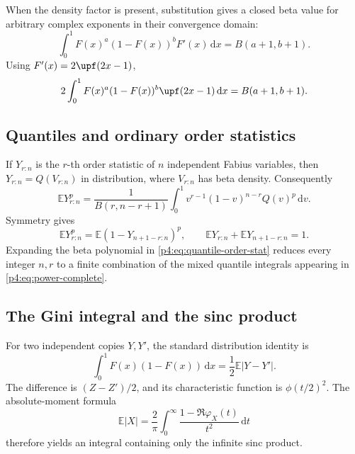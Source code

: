 \documentclass[11pt,oneside]{article}
\theoremstyle{definition}
\theoremstyle{remark}
\newcommand{\F}{F}
\newcommand{\Q}{Q}
\newcommand{\E}{\mathbb E}
\newcommand{\dd}{\,\mathrm d}
\newcommand{\1}{\mathbf 1}
\begin{document}
When the density factor is present, substitution gives a closed beta value for arbitrary
complex exponents in their convergence domain:
\begin{equation}\label{p4:eq:density-beta}
 \int_0^1\F(x)^a(1-\F(x))^b\F'(x)\dd x
 =B(a+1,b+1).
\end{equation}
Using \(\F'(x)=2\upf(2x-1)\),
\begin{equation}\label{p4:eq:up-density-beta}
 2\int_0^1\F(x)^a(1-\F(x))^b\upf(2x-1)\dd x
 =B(a+1,b+1).
\end{equation}

\subsection{Quantiles and ordinary order statistics}

If \(Y_{r:n}\) is the \(r\)-th order statistic of \(n\) independent Fabius variables,
then \(Y_{r:n}=\Q(V_{r:n})\) in distribution, where \(V_{r:n}\) has beta density.
Consequently
\begin{equation}\label{p4:eq:quantile-order-stat}
 \E Y_{r:n}^p
 =\frac1{B(r,n-r+1)}
 \int_0^1v^{r-1}(1-v)^{n-r}\Q(v)^p\dd v.
\end{equation}
Symmetry gives
\begin{equation}\label{p4:eq:order-stat-symmetry}
 \E Y_{r:n}^p
 =\E(1-Y_{n+1-r:n})^p,
 \qquad
 \E Y_{r:n}+\E Y_{n+1-r:n}=1.
\end{equation}
Expanding the beta polynomial in \cref{p4:eq:quantile-order-stat} reduces every integer
\(n,r\) to a finite combination of the mixed quantile integrals appearing in
\cref{p4:eq:power-complete}.

\subsection{The Gini integral and the sinc product}

For two independent copies \(Y,Y'\), the standard distribution identity is
\begin{equation}\label{p4:eq:Gini-prob}
 \int_0^1\F(x)(1-\F(x))\dd x
 =\frac12\E|Y-Y'|.
\end{equation}
The difference is \((Z-Z')/2\), and its characteristic function is
\(\phi(t/2)^2\).  The absolute-moment formula
\begin{equation}\label{p4:eq:absolute-char}
 \E|X|=\frac2\pi\int_0^\infty
 \frac{1-\Re\varphi_X(t)}{t^2}\dd t
\end{equation}
therefore yields an integral containing only the infinite sinc product.
\end{document}
